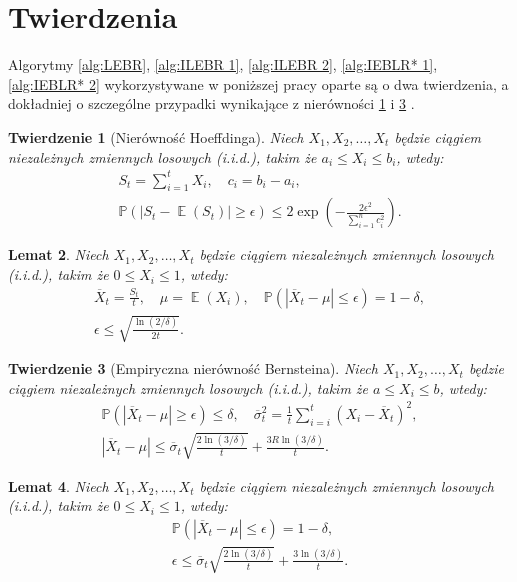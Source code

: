 \documentclass[inzynierska]{pwr_wmat_praca_dyplomowa}
\theoremstyle{plain}
\newtheorem{theorem}{Twierdzenie}
\numberwithin{theorem}{chapter}
\newtheorem{lemma}[theorem]{Lemat}
\theoremstyle{definition}
\numberwithin{theorem}{chapter}
\DeclareMathOperator{\EX}{\mathbb{E}}%
\newcommand{\probP}{\mathbb{P}}
\begin{document}
	\section{Twierdzenia}
	Algorytmy \ref{alg:LEBR}, \ref{alg:ILEBR 1}, \ref{alg:ILEBR 2}, \ref{alg:IEBLR* 1}, \ref{alg:IEBLR* 2} wykorzystywane w poniższej pracy oparte są o dwa twierdzenia, a dokładniej o szczególne przypadki wynikające z nierówności \ref{Hoeffding ineq} i \ref{Bernsteina emp ineq}  \cite{heidrich2011non}.
	\begin{theorem}[Nierówność Hoeffdinga]
		\label{Hoeffding ineq}
		Niech $X_1, X_2, \dots, X_t$ będzie ciągiem niezależnych zmiennych losowych (i.i.d.), takim że $a_i \le X_i \le b_i$, wtedy:
		\begin{gather*}
			S_t = \sum_{i=1}^{t} X_i, \quad c_i = b_i - a_i,  \\
			\probP(|S_t - \EX(S_t)| \ge \epsilon ) \le 2\exp\left( -\frac{2\epsilon^2}{\sum_{i=1}^{n} c_i^2} \right).
		\end{gather*}
	\end{theorem}
	\begin{lemma}
		\label{Hoeffding ineq lemma}
		Niech $X_1, X_2, \dots, X_t$ będzie ciągiem niezależnych zmiennych losowych (i.i.d.), takim że $0 \le X_i \le 1$, wtedy:
		\begin{gather*}
			\overline{X}_t = \frac{S_t}{t},\quad 
			\mu = \EX(X_i), \quad  	
			\probP(|\overline{X}_t - \mu | \le \epsilon ) = 1 - \delta,  \\
			\epsilon \le  \sqrt{\frac{\ln(2/\delta)}{2t}} .
		\end{gather*}
	\end{lemma}
	\begin{theorem}[Empiryczna nierówność Bernsteina]
		\label{Bernsteina emp ineq}
		Niech $X_1, X_2, \dots, X_t$ będzie ciągiem niezależnych zmiennych losowych (i.i.d.), takim że $a \le X_i \le b$, wtedy:
		\begin{gather*}
			\probP(|\overline{X}_t - \mu| \ge \epsilon ) \le  \delta,\quad \overline \sigma_t^2 = \frac{1}{t}\sum_{i=i}^{t}(X_i - \overline{X}_t)^2, \\
			|\overline{X}_t - \mu | \le \overline{\sigma}_t \sqrt{\frac{2\ln(3/\delta)}{t}} + \frac{3 R \ln{(3 / \delta)}}{t}.
		\end{gather*}
	\end{theorem}
	\begin{lemma}\label{Bernsteina emp ineq lemma}
		Niech $X_1, X_2, \dots, X_t$ będzie ciągiem niezależnych zmiennych losowych (i.i.d.), takim że $0 \le X_i \le 1$, wtedy:
		\begin{gather*}
			\probP(|\overline{X}_t - \mu | \le \epsilon ) = 1 - \delta, \\
			\epsilon \le \overline{\sigma}_t \sqrt{\frac{2\ln(3/\delta)}{t}} + \frac{3  \ln{(3 / \delta)}}{t}.
		\end{gather*}
	\end{lemma}
\end{document}

